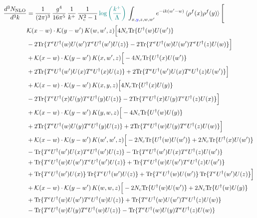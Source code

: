 \documentclass[9pt]{article}
\numberwithin{equation}{section}
\begin{document}
\begin{align}
    \frac{d^{3}N_{\mathrm{NLO}}}{d^{3}k} & = \frac{1}{(2\pi)^{3}}\,\frac{g^{4}}{16\pi^{5}}\,\frac{1}{k^{+}}\,\frac{1}{N^{2}_{c}-1}\,{\color{teal}\log{\left(\frac{k^{+}}{\Lambda}\right)}}\,\int_{x,{\color{blue}y},z,w,w'}e^{-ik(w'-w)}\,\langle\rho^{f}(x)\rho^{f}(y) \rangle\,\Bigg[\notag \\ & \mathcal K(x-w)\cdot\mathcal K(y-w')\,K(w,w',z)\Big[4 N_{c}{\rm Tr}\{U^\dagger(w)U(w')\}\notag\\
&-2{\rm Tr}\{T^eU^\dagger(w)U(w')T^eU^\dagger(w')U(z)\}-2{\rm Tr}\{T^eU^\dagger(w)U(w')T^eU^\dagger(z)U(w)\}\Big]\notag\\
&+\mathcal K(x-w)\cdot\mathcal K(y-w')\,K(x,w',z)\Big[-4 N_{c}{\rm Tr}\{U^\dagger(x)U(w')\}\notag\\
&+2{\rm Tr}\{T^eU^\dagger(w')U(x)T^eU^\dagger(x)U(z)\}+2{\rm Tr}\{T^eU^\dagger(w')U(x)T^eU^\dagger(z)U(w')\}\Big]\notag\\
&+\mathcal K(x-w)\cdot\mathcal K(y-w')\,K(x,y,z)\Big[4 N_{c}{\rm Tr}\{U^\dagger(x)U(y)\}\notag\\
&-2{\rm Tr}\{T^eU^\dagger(x)U(y)T^eU^\dagger(y)U(z)\}-2{\rm Tr}\{T^eU^\dagger(x)U(y)T^eU^\dagger(z)U(x)\}\Big]\notag\\
&+\mathcal K(x-w)\cdot\mathcal K(y-w')\,K(y,w,z)\Big[-4 N_{c}{\rm Tr}\{U^\dagger(w)U(y)\}\notag\\
&+2{\rm Tr}\{T^eU^\dagger(w)U(y)T^eU^\dagger(y)U(z)\}+2{\rm Tr}\{T^eU^\dagger(w)U(y)T^eU^\dagger(z)U(w)\}\Big]\notag\\
&+\mathcal K(x-w)\cdot\mathcal K(y-w')\,K(w',w',z)\Big[-2 N_{c}{\rm Tr}\{U^\dagger(w)U(w')\}+2 N_{c}{\rm Tr}\{U^\dagger(x)U(w')\}\notag\\
&-{\rm Tr}\{T^eU^\dagger(w')U(x)T^eU^\dagger(w')U(z)\}-{\rm Tr}\{T^eU^\dagger(w')U(x)T^eU^\dagger(z)U(w')\}\notag\\
&+{\rm Tr}\{T^eU^\dagger(w)U(w')T^eU^\dagger(w')U(z)\}+{\rm Tr}\{T^eU^\dagger(w)U(w')T^eU^\dagger(z)U(w')\}\notag\\
&+{\rm Tr}\{T^eU^\dagger(w')U(x)\}\,{\rm Tr}\{T^eU^\dagger(w')U(z)\}+{\rm Tr}\{T^eU^\dagger(w)U(w')\}\,{\rm Tr}\{T^eU^\dagger(w')U(z)\}\Big]\notag\\
&+\mathcal K(x-w)\cdot\mathcal K(y-w')\,K(w,w,z)\Big[-2 N_{c}{\rm Tr}\{U^\dagger(w)U(w')\}+2 N_{c}{\rm Tr}\{U^\dagger(w)U(y)\}\notag\\
&+{\rm Tr}\{T^eU^\dagger(w)U(w')T^eU^\dagger(w)U(z)\}+{\rm Tr}\{T^eU^\dagger(w)U(w')T^eU^\dagger(z)U(w)\}\notag\\
&-{\rm Tr}\{T^eU^\dagger(w)U(y)T^eU^\dagger(w)U(z)\}-{\rm Tr}\{T^eU^\dagger(w)U(y)T^eU^\dagger(z)U(w)\}\notag\\

\end{align}
\end{document}
